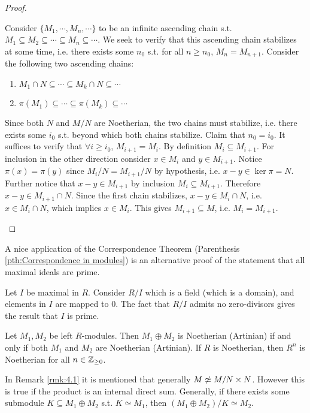 \documentclass{article}
\begin{document}
\begin{proof}
\begin{itemize}
        Consider $\{M_1, \cdots, M_n, \cdots\}$ to be an infinite ascending chain s.t. $M_1\subseteq M_2\subseteq \cdots \subseteq M_n \subseteq \cdots$. We seek to verify that this ascending chain stabilizes at some time, i.e. there exists some $n_0$ s.t. for all $n \geq n_0$, $M_n = M_{n+1}$. Consider the following two ascending chains:
        \begin{enumerate}[label=(\arabic*)]
            \item $M_1\cap N \subseteq \cdots \subseteq M_k\cap N \subseteq \cdots $
            \item $\pi(M_1)\subseteq \cdots \subseteq \pi(M_k) \subseteq \cdots$
        \end{enumerate}
        Since both $N$ and $M/N$ are Noetherian, the two chains must stabilize, i.e. there exists some $i_0$ s.t. beyond which both chains stabilize. Claim that $n_0 = i_0$. It suffices to verify that $\forall i \geq i_0$, $M_{i+1} = M_i$. By definition $M_i\subseteq M_{i+1}$. For inclusion in the other direction consider $x\in M_i$ and $y\in M_{i+1}$. Notice $\pi(x) = \pi(y)$ since $M_i/N = M_{i+1}/N$ by hypothesis, i.e. $x - y \in \ker\pi = N$. Further notice that $x - y \in M_{i+1}$ by inclusion $M_i \subseteq M_{i+1}$. Therefore $x - y \in M_{i+1} \cap N$. Since the first chain stabilizes, $x - y \in M_i \cap N$, i.e. $x \in M_i\cap N$, which implies $x\in M_i$. This gives $M_{i+1} \subseteq M$, i.e. $M_i = M_{i+1}$.
    \end{itemize}
\end{proof}

\begin{remark}
    A nice application of the Correspondence Theorem (Parenthesis \ref{pth:Correspondence in modules}) is an alternative proof of the statement that all maximal ideals are prime. 

    Let $I$ be maximal in $R$. Consider $R/I$ which is a field (which is a domain), and elements in $I$ are mapped to 0. The fact that $R/I$ admits no zero-divisors gives the result that $I$ is prime. 
\end{remark}

\begin{corollary}
    Let $M_1, M_2$ be left $R$-modules. Then $M_1\oplus M_2$ is Noetherian (Artinian) if and only if both $M_1$ and $M_2$ are Noetherian (Artinian). If $R$ is Noetherian, then $R^n$ is Noetherian for all $n\in\mathbb{Z}_{\geq 0}$.
\end{corollary}

\begin{remark}
    In Remark \ref{rmk:4.1} it is mentioned that generally $M \centernot\simeq M/N \times N$. However this is true if the product is an internal direct sum. Generally, if there exists some submodule $K \subseteq M_1 \oplus M_2$ s.t. $K \simeq M_1$, then $(M_1 \oplus M_2)/K \simeq M_2$. 
\end{remark}
\end{document}
